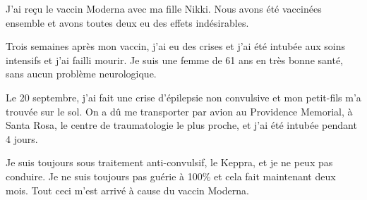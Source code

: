 J'ai reçu le vaccin Moderna avec ma fille Nikki. Nous avons été vaccinées
ensemble et avons toutes deux eu des effets indésirables.

Trois semaines après mon vaccin, j'ai eu des crises et j'ai été intubée aux
soins intensifs et j'ai failli mourir. Je suis une femme de 61 ans en très bonne
santé, sans aucun problème neurologique.

Le 20 septembre, j'ai fait une crise d'épilepsie non convulsive et mon
petit-fils m'a trouvée sur le sol. On a dû me transporter par avion au
Providence Memorial, à Santa Rosa, le centre de traumatologie le plus proche, et
j'ai été intubée pendant 4 jours.

Je suis toujours sous traitement anti-convulsif, le Keppra, et je ne peux pas
conduire. Je ne suis toujours pas guérie à 100\% et cela fait maintenant deux
mois. Tout ceci m'est arrivé à cause du vaccin Moderna.

